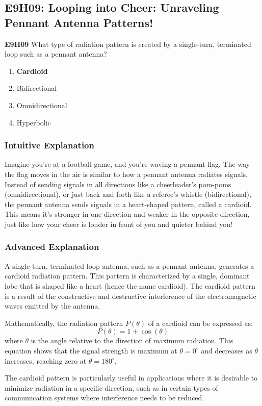 \subsection{E9H09: Looping into Cheer: Unraveling Pennant Antenna Patterns!}

\begin{tcolorbox}[colback=gray!10!white,colframe=black!75!black,title=Question E9H09]
\textbf{E9H09} What type of radiation pattern is created by a single-turn, terminated loop such as a pennant antenna?
\begin{enumerate}[label=\Alph*.]
    \item \textbf{Cardioid}
    \item Bidirectional
    \item Omnidirectional
    \item Hyperbolic
\end{enumerate}
\end{tcolorbox}

\subsubsection*{Intuitive Explanation}
Imagine you’re at a football game, and you’re waving a pennant flag. The way the flag moves in the air is similar to how a pennant antenna radiates signals. Instead of sending signals in all directions like a cheerleader’s pom-poms (omnidirectional), or just back and forth like a referee’s whistle (bidirectional), the pennant antenna sends signals in a heart-shaped pattern, called a cardioid. This means it’s stronger in one direction and weaker in the opposite direction, just like how your cheer is louder in front of you and quieter behind you!

\subsubsection*{Advanced Explanation}
A single-turn, terminated loop antenna, such as a pennant antenna, generates a cardioid radiation pattern. This pattern is characterized by a single, dominant lobe that is shaped like a heart (hence the name cardioid). The cardioid pattern is a result of the constructive and destructive interference of the electromagnetic waves emitted by the antenna.

Mathematically, the radiation pattern \( P(\theta) \) of a cardioid can be expressed as:
\[
P(\theta) = 1 + \cos(\theta)
\]
where \( \theta \) is the angle relative to the direction of maximum radiation. This equation shows that the signal strength is maximum at \( \theta = 0^\circ \) and decreases as \( \theta \) increases, reaching zero at \( \theta = 180^\circ \).

The cardioid pattern is particularly useful in applications where it is desirable to minimize radiation in a specific direction, such as in certain types of communication systems where interference needs to be reduced.

